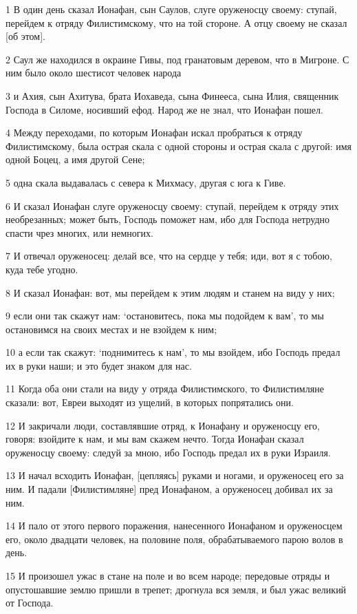 \par 1 В один день сказал Ионафан, сын Саулов, слуге оруженосцу своему: ступай, перейдем к отряду Филистимскому, что на той стороне. А отцу своему не сказал [об этом].
\par 2 Саул же находился в окраине Гивы, под гранатовым деревом, что в Мигроне. С ним было около шестисот человек народа
\par 3 и Ахия, сын Ахитува, брата Иохаведа, сына Финееса, сына Илия, священник Господа в Силоме, носивший ефод. Народ же не знал, что Ионафан пошел.
\par 4 Между переходами, по которым Ионафан искал пробраться к отряду Филистимскому, была острая скала с одной стороны и острая скала с другой: имя одной Боцец, а имя другой Сене;
\par 5 одна скала выдавалась с севера к Михмасу, другая с юга к Гиве.
\par 6 И сказал Ионафан слуге оруженосцу своему: ступай, перейдем к отряду этих необрезанных; может быть, Господь поможет нам, ибо для Господа нетрудно спасти чрез многих, или немногих.
\par 7 И отвечал оруженосец: делай все, что на сердце у тебя; иди, вот я с тобою, куда тебе угодно.
\par 8 И сказал Ионафан: вот, мы перейдем к этим людям и станем на виду у них;
\par 9 если они так скажут нам: `остановитесь, пока мы подойдем к вам', то мы остановимся на своих местах и не взойдем к ним;
\par 10 а если так скажут: `поднимитесь к нам', то мы взойдем, ибо Господь предал их в руки наши; и это будет знаком для нас.
\par 11 Когда оба они стали на виду у отряда Филистимского, то Филистимляне сказали: вот, Евреи выходят из ущелий, в которых попрятались они.
\par 12 И закричали люди, составлявшие отряд, к Ионафану и оруженосцу его, говоря: взойдите к нам, и мы вам скажем нечто. Тогда Ионафан сказал оруженосцу своему: следуй за мною, ибо Господь предал их в руки Израиля.
\par 13 И начал всходить Ионафан, [цепляясь] руками и ногами, и оруженосец его за ним. И падали [Филистимляне] пред Ионафаном, а оруженосец добивал их за ним.
\par 14 И пало от этого первого поражения, нанесенного Ионафаном и оруженосцем его, около двадцати человек, на половине поля, обрабатываемого парою волов в день.
\par 15 И произошел ужас в стане на поле и во всем народе; передовые отряды и опустошавшие землю пришли в трепет; дрогнула вся земля, и был ужас великий от Господа.
